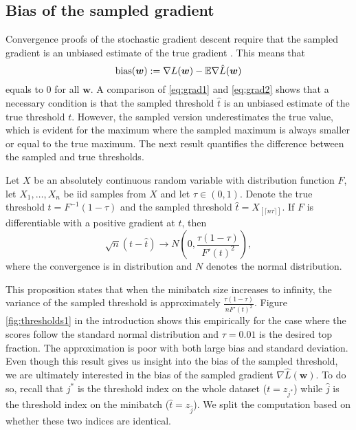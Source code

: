 \subsection{Bias of the sampled gradient}

Convergence proofs of the stochastic gradient descent require that the sampled gradient is an unbiased estimate of the true gradient \cite{bottou2018optimization}. This means that
\begin{equation}\label{eq:defin_bias}
  \operatorname{bias}(\bm{w}) := \nabla L(\bm{w}) - \mathbb{E} \nabla \hat L(\bm{w})
\end{equation}
equals to $0$ for all $\bm{w}$. A comparison of \eqref{eq:grad1} and \eqref{eq:grad2} shows that a necessary condition is that the sampled threshold $\hat t$ is an unbiased estimate of the true threshold $t$. However, the sampled version underestimates the true value, which is evident for the maximum where the sampled maximum is always smaller or equal to the true maximum. The next result quantifies the difference between the sampled and true thresholds.

\begin{proposition}\label{proposition:bound}
  Let $X$ be an absolutely continuous random variable with distribution function $F$, let $X_1,\dots,X_n$ be iid samples from $X$ and let $\tau\in(0,1)$. Denote the true threshold $t=F^{-1}(1-\tau)$ and the sampled threshold $\hat t=X_{[\lceil n\tau\rceil]}$. If $F$ is differentiable with a positive gradient at $t$, then
  \begin{equation*}
    \sqrt{n}(t - \hat t) \rightarrow N\left(0, \frac{\tau(1-\tau)}{F'(t)^2}\right),
  \end{equation*}
  where the convergence is in distribution and $N$ denotes the normal distribution.
\end{proposition}

This proposition states that when the minibatch size increases to infinity, the variance of the sampled threshold is approximately $\frac{\tau(1-\tau)}{nF'(t)^2}$. Figure \ref{fig:thresholds1} in the introduction shows this empirically for the case where the scores follow the standard normal distribution and $\tau=0.01$ is the desired top fraction. The approximation is poor with both large bias and standard deviation. Even though this result gives us insight into the bias of the sampled threshold, we are ultimately interested in the bias of the sampled gradient $\nabla \hat L(\bm{w})$. To do so, recall that $j^*$ is the threshold index on the whole dataset ($t=z_{j^*}$) while $\hat j$ is the threshold index on the minibatch ($\hat t=z_{\hat j}$). We split the computation based on whether these two indices are identical.

